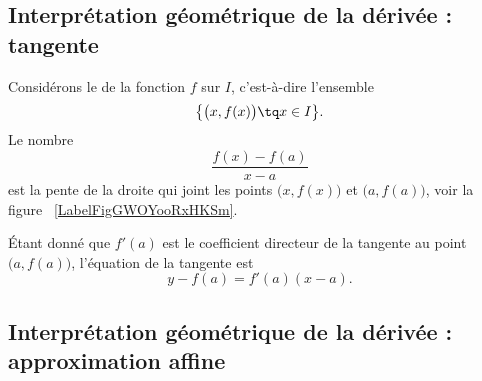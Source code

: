 \subsection[Interprétation géométrique : tangente]{Interprétation géométrique de la dérivée : tangente}

Considérons le  de la fonction \( f\) sur \( I\), c'est-à-dire l'ensemble
\begin{equation}
	\big\{ \big( x,f(x) \big)\tq x\in I \big\}.
\end{equation}
Le nombre
\begin{equation}
	\frac{ f(x)-f(a) }{ x-a }
\end{equation}
est la pente de la droite qui joint les points \( \big( x,f(x) \big)\) et \( \big( a,f(a) \big)\), voir la figure ~\ref{LabelFigGWOYooRxHKSm}. %
\newcommand{\CaptionFigGWOYooRxHKSm}{Le coefficient directeur de la corde entre \( a\) et \( x\).}


Étant donné que \( f'(a)\) est le coefficient directeur de la tangente au point \( \big( a,f(a) \big)\), l'équation de la tangente est
\begin{equation}		\label{EqTgfaen}
	y-f(a)=f'(a)(x-a).
\end{equation}

\subsection[Interprétation géométrique : approximation affine]{Interprétation géométrique de la dérivée : approximation affine}

